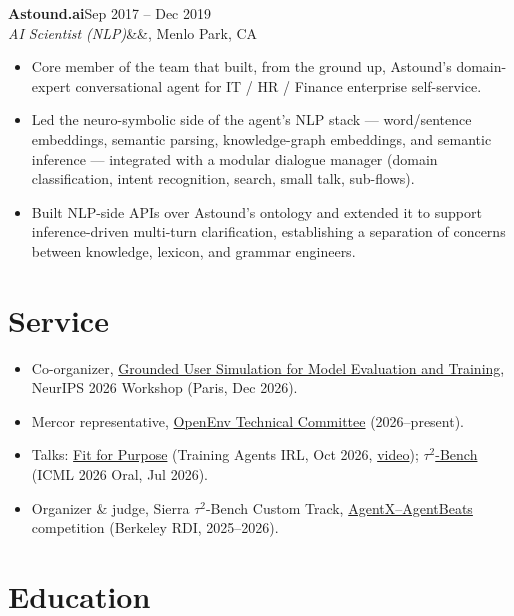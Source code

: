 \documentclass[10.5pt,a4paper]{article}
\newcommand{\position}[5]{%
  \noindent
  \textbf{#1}\hfill\textcolor{muted}{#3}\\
  \textit{#4}\ifx&#5&\else, #5\fi\hfill\textcolor{muted}{#2}\par
  \vspace{2pt}
}
\begin{document}
\position{Astound.ai}{Menlo Park, CA}{Sep 2017 – Dec 2019}
  {AI Scientist (NLP)}{}
\begin{itemize}
  \item Core member of the team that built, from the ground up, Astound's domain-expert conversational agent for IT / HR / Finance enterprise self-service.
  \item Led the neuro-symbolic side of the agent's NLP stack — word/sentence embeddings, semantic parsing, knowledge-graph embeddings, and semantic inference — integrated with a modular dialogue manager (domain classification, intent recognition, search, small talk, sub-flows).
  \item Built NLP-side APIs over Astound's ontology and extended it to support inference-driven multi-turn clarification, establishing a separation of concerns between knowledge, lexicon, and grammar engineers.
\end{itemize}

\section*{Service}

\begin{itemize}
  \item Co-organizer, \href{https://usersim-workshop.github.io/}{Grounded User Simulation for Model Evaluation and Training}, NeurIPS 2026 Workshop (Paris, Dec 2026).
  \item Mercor representative, \href{https://github.com/openenv/OpenEnv/blob/main/GOVERNANCE.md}{OpenEnv Technical Committee} (2026--present).
  \item Talks: \href{https://victorbarres.github.io/assets/html/fit-for-purpose-training-agents-irl-2026.html}{Fit for Purpose} (Training Agents IRL, Oct 2026, \href{https://youtu.be/CKFUx7COIwQ?t=1170}{video}); \href{https://victorbarres.github.io/assets/html/tau2-bench-icml2026-oral.html}{$\tau^2$-Bench} (ICML 2026 Oral, Jul 2026).
  \item Organizer \& judge, Sierra $\tau^2$-Bench Custom Track, \href{https://rdi.berkeley.edu/agentx-agentbeats.html}{AgentX–AgentBeats} competition (Berkeley RDI, 2025–2026).
\end{itemize}

\section*{Education}
\end{document}
